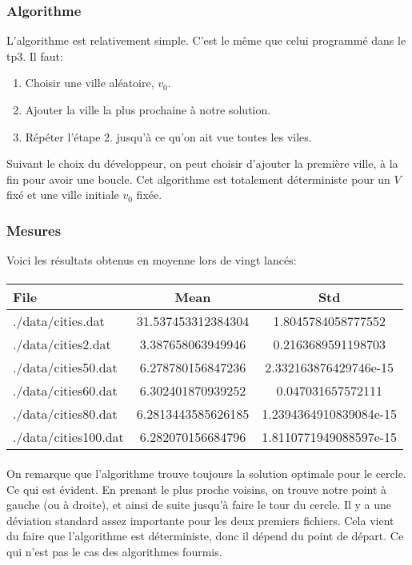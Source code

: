 \documentclass[a4paper, 11pt]{article}
\begin{document}
\subsubsection{Algorithme}
L'algorithme est relativement simple. C'est le même que celui programmé dans le tp3.
Il faut:
\begin{enumerate}
 \item Choisir une ville aléatoire, $v_0$.
 \item Ajouter la ville la plus prochaine à notre solution.
 \item Répéter l'étape 2. jusqu'à ce qu'on ait vue toutes les viles.
\end{enumerate}

Suivant le choix du développeur, on peut choisir d'ajouter la première ville, à la fin pour avoir une boucle.
Cet algorithme est totalement déterministe pour un $V$ fixé et une ville initiale $v_0$ fixée.

\subsubsection{Mesures}
Voici les résultats obtenus en moyenne lors de vingt lancés:
\paragraph{}
\begin{tabular}{|l | c |c |}
\hline
 File & Mean & Std \\
\hline
./data/cities.dat	& 31.537453312384304  & 1.8045784058777552\\
\hline
./data/cities2.dat	& 3.387658063949946  & 0.2163689591198703\\
\hline
./data/cities50.dat	& 6.278780156847236  & 2.332163876429746e-15\\
\hline
./data/cities60.dat	& 6.302401870939252  & 0.047031657572111\\
\hline
./data/cities80.dat	& 6.2813443585626185  & 1.2394364910839084e-15\\
\hline
./data/cities100.dat	& 6.282070156684796  & 1.8110771949088597e-15\\
\hline
\end{tabular}
\paragraph{}
On remarque que l'algorithme trouve toujours la solution optimale pour le cercle. Ce qui est évident. En prenant le plus proche voisins,
on trouve notre point à gauche (ou à droite), et ainsi de suite jusqu'à faire le tour du cercle.
Il y a une déviation standard assez importante pour les deux premiers fichiers. Cela vient du faire que l'algorithme est déterministe, donc
il dépend du point de départ. Ce qui n'est pas le cas des algorithmes fourmis.
\end{document}
